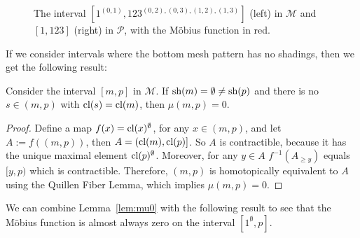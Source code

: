\documentclass[11pt,a4paper,oneside]{article}
\begin{document}
\begin{figure}\centering
{}
\caption{The interval $[1^{(0,1)},123^{(0,2),(0,3),(1,2),(1,3)}]$
(left) in $\mathcal{M}$ and $[1,123]$ (right) in $\mathcal{P}$, 
with the M\"obius function in red.}\label{fig:1-123}
\end{figure}

If we consider intervals where the bottom mesh pattern has no shadings, then we
get the following result:
\begin{lem}\label{lem:mu0}
Consider the interval $[m,p]$ in $\mathcal{M}$. If $\operatorname{\textrm{sh}}(m)=\emptyset\not=\operatorname{\textrm{sh}}(p)$
and there is no $s\in(m,p)$ with $\operatorname{\textrm{cl}}(s)=\operatorname{\textrm{cl}}(m)$, then $\mu(m,p)=0$.
\begin{proof}
Define a map $f(x)=\operatorname{\textrm{cl}}(x)^\emptyset$, for any $x\in(m,p)$, and let $A:=f((m,p))$, then $A=(\operatorname{\textrm{cl}}(m),\operatorname{\textrm{cl}}(p)]$.
So  $A$ is contractible, because it has the
unique maximal element $\operatorname{\textrm{cl}}(p)^\emptyset$. Moreover, for any $y\in A$ $f^{-1}(A_{\ge y})$
equals $[y,p)$ which is contractible. Therefore, $(m,p)$ is homotopically equivalent
to $A$ using the Quillen Fiber Lemma, which implies $\mu(m,p)=0$.
\end{proof}
\end{lem}

We can combine Lemma~\ref{lem:mu0} with the following result to see that the
M\"obius function is almost always zero on the interval $[1^\emptyset,p]$.
\end{document}
